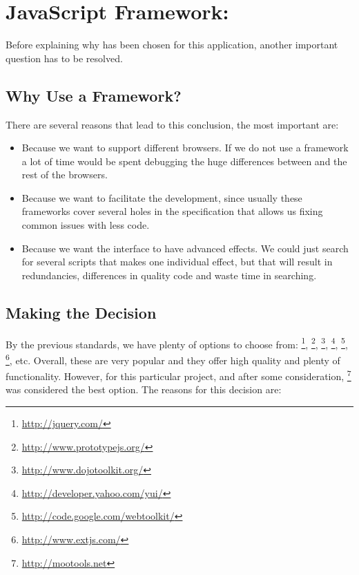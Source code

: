 \section{JavaScript Framework: } %
\label{sec:mootools}

Before explaining why  has been chosen for this application, another important question has to be resolved.

\subsection{Why Use a  Framework?} %
\label{sub:whymootools}

There are several reasons that lead to this conclusion, the most important are:

\begin{itemize}

  \item Because we want to support different browsers.
  If we do not use a framework a lot of time would be spent debugging the huge differences between  and the rest of the browsers.

  \item Because we want to facilitate the development, since usually these frameworks cover several holes in the  specification that allows us fixing common issues with less code.

  \item Because we want the interface to have advanced effects.
  We could just search for several scripts that makes one individual effect, but that will result in redundancies, differences in quality code and waste time in searching.

\end{itemize}


\subsection{Making the Decision} %
\label{sub:decision}

By the previous standards, we have plenty of options to choose from:
\footnote{\url{http://jquery.com/}},
\footnote{\url{http://www.prototypejs.org/}},
\footnote{\url{http://www.dojotoolkit.org/}},
\footnote{\url{http://developer.yahoo.com/yui/}},
\footnote{\url{http://code.google.com/webtoolkit/}},
\footnote{\url{http://www.extjs.com/}}, etc.
Overall, these are very popular and they offer high quality and plenty of functionality.
However, for this particular project, and after some consideration, \footnote{\url{http://mootools.net}} was considered the best option.
The reasons for this decision are:

